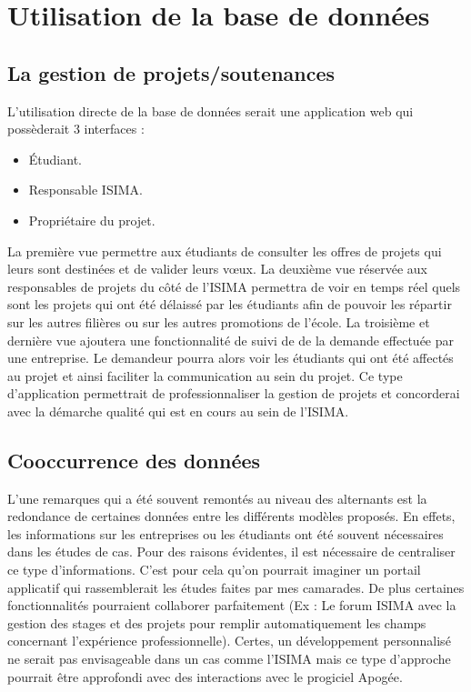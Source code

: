\documentclass[a4paper,11pt]{report}
\begin{document}
\chapter {Utilisation de la base de données}

\section{La gestion de projets/soutenances}
\normalsize{
L'utilisation directe de la base de données serait une application web qui possèderait 3 interfaces :
}

\begin{itemize}
\item Étudiant.
\item Responsable ISIMA.
\item Propriétaire du projet.\\
\end{itemize}

\normalsize{ 
La première vue permettre aux étudiants de consulter les offres de projets qui leurs sont destinées et de valider leurs vœux. La deuxième vue réservée aux responsables de projets du côté de l'ISIMA permettra de voir en temps réel quels sont les projets qui ont été délaissé par les étudiants afin de pouvoir les répartir sur les autres filières ou sur les autres promotions de l'école. La troisième et dernière vue ajoutera une fonctionnalité de suivi de de la demande effectuée par une entreprise. Le demandeur pourra alors voir les étudiants qui ont été affectés au projet et ainsi faciliter la communication au sein du projet. Ce type d'application permettrait de professionnaliser la gestion de projets et concorderai avec la démarche qualité qui est en cours au sein de l'ISIMA.
}

\section{Cooccurrence des données}
{
L'une remarques qui a été souvent remontés au niveau des alternants est la redondance de certaines données entre les différents modèles proposés. En effets, les informations sur les entreprises ou les étudiants ont été souvent nécessaires dans les études de cas. Pour des raisons évidentes, il est nécessaire de centraliser ce type d'informations. C'est pour cela qu'on pourrait imaginer un portail applicatif qui rassemblerait les études faites par mes camarades. De plus certaines fonctionnalités pourraient collaborer parfaitement (Ex : Le forum ISIMA avec la gestion des stages et des projets pour remplir automatiquement les champs concernant l'expérience professionnelle). Certes, un développement personnalisé ne serait pas envisageable dans un cas comme l'ISIMA mais ce type d'approche pourrait être approfondi avec des interactions avec le progiciel Apogée.
}
\end{document}
